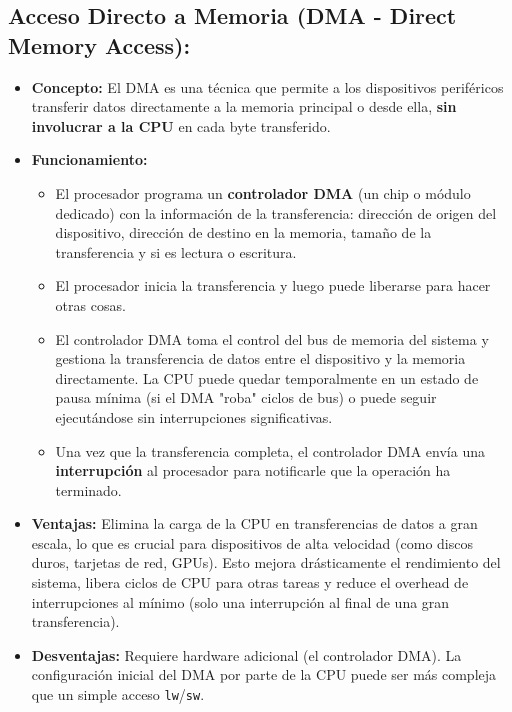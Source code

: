 \documentclass[12pt, a4paper]{article}
\begin{document}
\subsection*{Acceso Directo a Memoria (DMA - Direct Memory Access):}
\begin{itemize}
    \item \textbf{Concepto:} El DMA es una técnica que permite a los dispositivos periféricos transferir datos directamente a la memoria principal o desde ella, \textbf{sin involucrar a la CPU} en cada byte transferido.
    \item \textbf{Funcionamiento:}
    \begin{itemize}
        \item El procesador programa un \textbf{controlador DMA} (un chip o módulo dedicado) con la información de la transferencia: dirección de origen del dispositivo, dirección de destino en la memoria, tamaño de la transferencia y si es lectura o escritura.
        \item El procesador inicia la transferencia y luego puede liberarse para hacer otras cosas.
        \item El controlador DMA toma el control del bus de memoria del sistema y gestiona la transferencia de datos entre el dispositivo y la memoria directamente. La CPU puede quedar temporalmente en un estado de pausa mínima (si el DMA "roba" ciclos de bus) o puede seguir ejecutándose sin interrupciones significativas.
        \item Una vez que la transferencia completa, el controlador DMA envía una \textbf{interrupción} al procesador para notificarle que la operación ha terminado.
    \end{itemize}
    \item \textbf{Ventajas:} Elimina la carga de la CPU en transferencias de datos a gran escala, lo que es crucial para dispositivos de alta velocidad (como discos duros, tarjetas de red, GPUs). Esto mejora drásticamente el rendimiento del sistema, libera ciclos de CPU para otras tareas y reduce el overhead de interrupciones al mínimo (solo una interrupción al final de una gran transferencia).
    \item \textbf{Desventajas:} Requiere hardware adicional (el controlador DMA). La configuración inicial del DMA por parte de la CPU puede ser más compleja que un simple acceso \texttt{lw}/\texttt{sw}.
\end{itemize}
\end{document}
